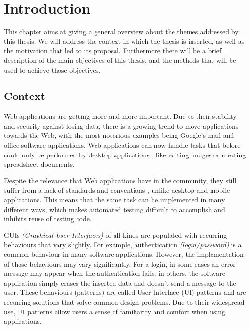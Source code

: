 \chapter{Introduction} \label{chap:intro}


This chapter aims at giving a general overview about the themes addressed by this thesis. We will address the context in which the thesis is inserted, as well as the motivation that led to its proposal. Furthermore there will be a brief description of the main objectives of this thesis, and the methods that will be used to achieve those objectives.

\section{Context} \label{sec:context}

Web applications are getting more and more important. Due to their stability and security against losing data, there is a growing trend to move applications towards the Web, with the most notorious examples being Google's mail and office software applications. Web applications can now handle tasks that before could only be performed by desktop applications \cite{garrett2005ajax}, like editing images or creating spreadsheet documents.

Despite the relevance that Web applications have in the community, they still suffer from a lack of standards and conventions \cite{constantine2002usage}, unlike desktop and mobile applications. This means that the same task can be implemented in many different ways, which makes automated testing difficult to accomplish and inhibits reuse of testing code.

GUIs \textit{(Graphical User Interfaces)} of all kinds are populated with recurring behaviours that vary slightly. For example, authentication \textit{(login/password)} is a common behaviour in many software applications. However, the implementation of those behaviours may vary significantly. For a login, in some cases an error message may appear when the authentication fails; in others, the software application simply erases the inserted data and doesn't send a message to the user. These behaviours (patterns) are called User Interface (UI) patterns \cite{van2001patterns} and are recurring solutions that solve common design problems. Due to their widespread use, UI patterns allow users a sense of familiarity and comfort when using applications.

